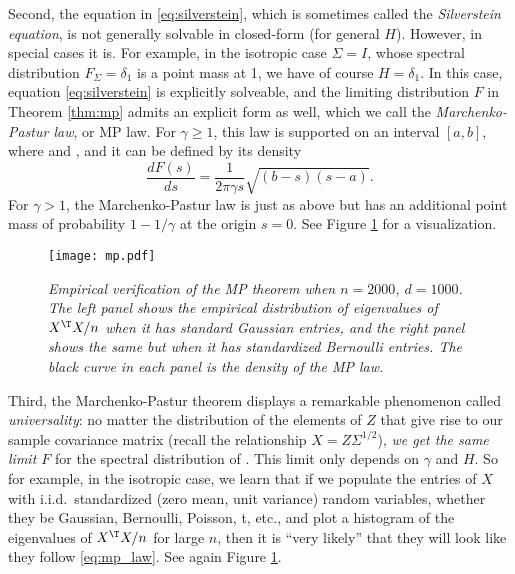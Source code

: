 \documentclass{article}
\begin{document}
Second, the equation in \eqref{eq:silverstein}, which is sometimes called the
\emph{Silverstein equation}, is not generally solvable in closed-form (for
general $H$). However, in special cases it is. For example, in the isotropic
case $\Sigma = I$, whose spectral distribution $F_\Sigma = \delta_1$ is a point
mass at 1, we have of course $H = \delta_1$. In this case, equation
\eqref{eq:silverstein} is explicitly solveable, and the limiting distribution
$F$ in Theorem \ref{thm:mp} admits an explicit form as well, which we call the
\emph{Marchenko-Pastur law}, or MP law. For $\gamma \geq 1$, this law is 
supported on an interval $[a,b]$, where  and
, and it can be defined by its density     
\begin{equation}
\label{eq:mp_law}
\frac{dF(s)}{ds} = \frac{1}{2 \pi \gamma s} \sqrt{(b-s)(s-a)}.
\end{equation}
For $\gamma > 1$, the Marchenko-Pastur law is just as above but has an
additional point mass of probability $1-1/\gamma$ at the origin $s=0$. See
Figure \ref{fig:mp} for a visualization.

\begin{figure}[htb]
\centering
\texttt{[image: mp.pdf]}
\caption{\it Empirical verification of the MP theorem when $n=2000$,
  $d=1000$. The left panel shows the empirical distribution of eigenvalues of
  $X^\T X/n$ when it has standard Gaussian entries, and the right panel shows 
  the same but when it has standardized Bernoulli entries. The black curve in
  each panel is the density of the MP law.}    
\label{fig:mp}
\end{figure}

Third, the Marchenko-Pastur theorem displays a remarkable phenomenon called
\emph{universality}: no matter the distribution of the elements of $Z$ that give
rise to our sample covariance matrix  (recall the
relationship $X = Z \Sigma^{1/2}$), \emph{we get the same limit $F$} for the
spectral distribution of \smash{$\hSigma$}. This limit only depends on $\gamma$
and $H$. So for example, in the isotropic case, we learn that if we populate the
entries of $X$ with i.i.d.\ standardized (zero mean, unit variance) random
variables, whether they be Gaussian, Bernoulli, Poisson, t, etc., and plot a
histogram of the eigenvalues of $X^\T X/n$ for large $n$, then it is ``very
likely'' that they will look like they follow \eqref{eq:mp_law}. See again
Figure \ref{fig:mp}.  
\end{document}
